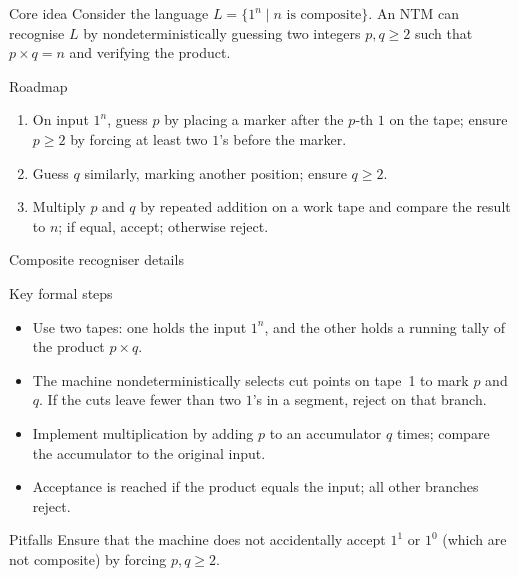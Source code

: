 \begin{frame}[t]{}
  \begin{tblock}{Core idea}
    Consider the language $L = \{1^n \mid n \text{ is composite}\}$.
    An NTM can recognise $L$ by nondeterministically guessing two
    integers $p,q \ge 2$ such that $p \times q = n$ and verifying the
    product.
  \end{tblock}
  \begin{tblock}{Roadmap}
    \begin{enumerate}
      \item On input $1^n$, guess $p$ by placing a marker after the
        $p$‑th $1$ on the tape; ensure $p \ge 2$ by forcing at least
        two $1$’s before the marker.
      \item Guess $q$ similarly, marking another position; ensure
        $q \ge 2$.
      \item Multiply $p$ and $q$ by repeated addition on a work tape
        and compare the result to $n$; if equal, accept; otherwise
        reject.
    \end{enumerate}
  \end{tblock}
  \label{fr:7.7-03}
\end{frame}

\begin{frame}[t]{Composite recogniser details}
  \begin{tblock}{Key formal steps}
    \begin{itemize}
      \item Use two tapes: one holds the input $1^n$, and the other
        holds a running tally of the product $p \times q$.
      \item The machine nondeterministically selects cut points on
        tape 1 to mark $p$ and $q$.  If the cuts leave fewer than two
        $1$’s in a segment, reject on that branch.
      \item Implement multiplication by adding $p$ to an accumulator
        $q$ times; compare the accumulator to the original input.
      \item Acceptance is reached if the product equals the input; all
        other branches reject.
    \end{itemize}
  \end{tblock}
  \begin{talert}{Pitfalls}
    Ensure that the machine does not accidentally accept $1^1$ or
        $1^0$ (which are not composite) by forcing $p,q\ge 2$.
  \end{talert}
  \label{fr:7.7-04}
\end{frame}


